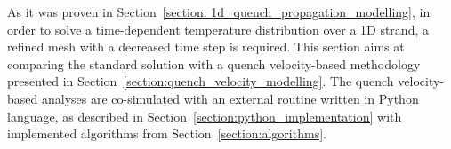 
As it was proven in Section~\ref{section: 1d_quench_propagation_modelling}, in order to solve a time-dependent temperature distribution over a 1D strand, a refined mesh with a decreased time step is required. This section aims at comparing the standard solution with a quench velocity-based methodology presented in Section~\ref{section:quench_velocity_modelling}. The quench velocity-based analyses are co-simulated with an external routine written in Python language, as described in Section~\ref{section:python_implementation} with implemented algorithms from Section~\ref{section:algorithms}.


